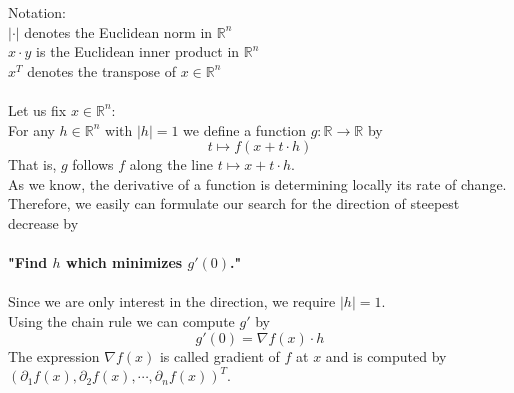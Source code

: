 \documentclass[17pt]{extarticle}
\begin{document}
Notation: \\
$|\cdot|$ denotes the Euclidean norm in $\mathbb{R}^{n}$\\
$x\cdot y$ is the Euclidean inner product in $\mathbb{R}^{n}$\\
$x^T$ denotes the transpose of $x\in\mathbb{R}^n$\\
\\
Let us fix $x\in\mathbb{R}^{n}$:
\\
For any $h\in\mathbb{R}^{n}$ with $|h|=1$
we define a function $g:\mathbb{R}\rightarrow\mathbb{R}$ by
$$
t\mapsto f(x+t\cdot h)
$$
That is, $g$ follows $f$ along the line $t\mapsto x+t\cdot h$.\\
As we know, the derivative of a function is determining locally its rate of change. Therefore, we easily can formulate our search for the direction of steepest decrease by \\
\\
\textbf{"Find $h$ which minimizes $g'(0)$."}\\
\\
Since we are only interest in the direction, we require $|h|=1$.\\
Using the chain rule we can compute $g'$ by
$$
g'(0)=\nabla f(x)\cdot h
$$
The expression $\nabla f(x)$ is called gradient of $f$ at $x$ and is computed by $(\partial_1 f(x), \partial_2 f(x), \cdots, \partial_n f(x))^T$.\\
\end{document}
